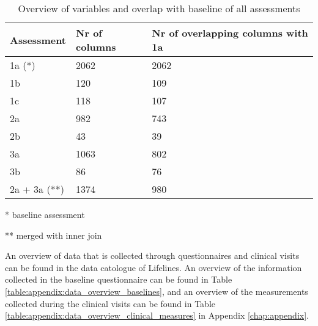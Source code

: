 \vspace{0.5cm}
\begin{table} [H]
    \centering
    \caption{Overview of variables and overlap with baseline of all assessments}
    \begin{tabular}{lll}
        \hline
        \multicolumn{1}{l}{Assessment} & \multicolumn{1}{l}{Nr of columns} & \multicolumn{1}{l}{Nr of overlapping columns with 1a} \\ \hline
        1a (*)                         & 2062                              & 2062                                                                      \\
        1b                             & 120                               & 109                                                                       \\
        1c                             & 118                               & 107                                                                       \\
        2a                             & 982                               & 743                                                                       \\
        2b                             & 43                                & 39                                                                        \\
        3a                             & 1063                              & 802                                                                       \\
        3b                             & 86                                & 76                                                                        \\
        2a + 3a (**)                       & 1374                              & 980                                 
    \end{tabular}
    \begin{tablenotes}
        \small
        \item \hspace{1cm} * baseline assessment
        \item \hspace{1cm} ** merged with inner join
      \end{tablenotes}
    \label{table:data:variable_overlap_before_preprocessing}
\end{table}

An overview of data that is collected through questionnaires and clinical visits can be found in the data catologue of Lifelines. An overview of the information collected in the baseline questionnaire can be found in Table \ref{table:appendix:data_overview_baselines}, and an overview of the measurements collected during the clinical visits can be found in Table \ref{table:appendix:data_overview_clinical_measures} in Appendix \ref{chap:appendix}. %

